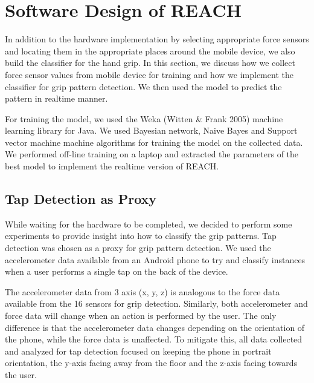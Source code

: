 \section{Software Design of REACH}
In addition to the hardware implementation by selecting appropriate force sensors and locating them in the appropriate places around the mobile device, we also build the classifier for the hand grip. In this section, we discuss how we collect force sensor values from mobile device for training and how we implement the classifier for grip pattern detection. We then used the model to predict the pattern in realtime manner.
\par
For training the model,  we used the Weka (Witten \& Frank 2005) machine learning library for Java. We used Bayesian network, Naive Bayes and Support vector machine machine algorithms for training the model on the collected data. We performed off-line training on a laptop and extracted the parameters of the best model to implement the realtime version of REACH.

\subsection{Tap Detection as Proxy}
While waiting for the hardware to be completed, we decided to perform some experiments to provide insight into how to  classify the grip patterns. Tap detection was chosen as a proxy for grip pattern detection. We used the accelerometer data available from an Android phone to try and classify instances when a user performs a single tap on the back of the device.
\par
The accelerometer data from 3 axis (x, y, z) is analogous to the force data available from the 16 sensors for grip detection. Similarly, both accelerometer and force data will change when an action is performed by the user. The only difference is that the accelerometer data changes depending on the orientation of the phone, while the force data is unaffected. To mitigate this, all data collected and analyzed for tap detection focused on keeping the phone in portrait orientation, the y-axis facing away from the floor and the z-axis facing towards the user.

